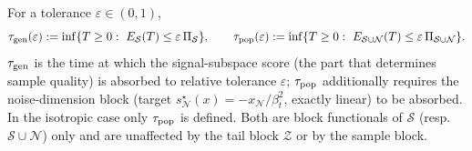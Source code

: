 \begin{definition}\label{def:taugen-p1}
For a tolerance $\varepsilon\in(0,1)$,
\[
\taugen(\varepsilon):=\inf\{T\ge0:\ E_{\mathcal S}(T)\le\varepsilon\,\Pi_{\mathcal S}\},\qquad
\tau_{\rm pop}(\varepsilon):=\inf\{T\ge0:\ E_{\mathcal S\cup\mathcal N}(T)\le\varepsilon\,\Pi_{\mathcal S\cup\mathcal N}\}.
\]
$\tau_{\mathrm{gen}}$ is the time at which the signal-subspace score (the part that determines sample quality) is absorbed to relative tolerance $\varepsilon$; $\tau_{\rm pop}$ additionally requires the noise-dimension block (target $s^\star_{\mathcal N}(x)=-x_{\mathcal N}/\beta_t^2$, exactly linear) to be absorbed. In the isotropic case only $\tau_{\rm pop}$ is defined. Both are block functionals of $\mathcal S$ (resp.\ $\mathcal S\cup\mathcal N$) only and are unaffected by the tail block $\mathcal Z$ or by the sample block.
\end{definition}

